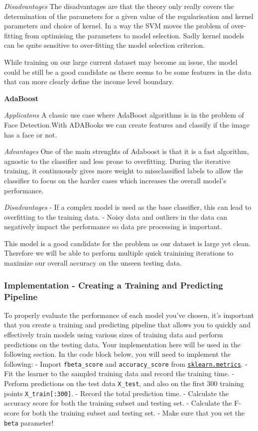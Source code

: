 \documentclass[11pt]{article}
\begin{document}
\emph{Disadvantages} The disadvantages are that the theory only really
covers the determination of the parameters for a given value of the
regularisation and kernel parameters and choice of kernel. In a way the
SVM moves the problem of over-fitting from optimising the parameters to
model selection. Sadly kernel models can be quite sensitive to
over-fitting the model selection criterion.

While training on our large current dataset may become an issue, the
model could be still be a good candidate as there seems to be some
features in the data that can more clearly define the income level
boundary.

\textbf{AdaBoost}

\emph{Applicatons} A classic use case where AdaBoost algorithms is in
the problem of Face Detection.With ADABooks we can create features and
classify if the image has a face or not.

\emph{Advantages} One of the main strenghts of Adaboost is that it is a
fast algorithm, agnostic to the classifier and less prone to
overfitting. During the iterative training, it continuously gives more
weight to missclassified labels to allow the classifier to focus on the
harder cases which increases the overall model's performance.

\emph{Disadvantages} - If a complex model is used as the base
classifier, this can lead to overfitting to the training data. - Noisy
data and outliers in the data can negatively impact the performance so
data pre processing is important.

This model is a good candidate for the problem as our dataset is large
yet clean. Therefore we will be able to perform multiple quick
trainining iterations to maximize our overall accuracy on the unseen
testing data.

    \subsubsection{Implementation - Creating a Training and Predicting
Pipeline}\label{implementation---creating-a-training-and-predicting-pipeline}

To properly evaluate the performance of each model you've chosen, it's
important that you create a training and predicting pipeline that allows
you to quickly and effectively train models using various sizes of
training data and perform predictions on the testing data. Your
implementation here will be used in the following section. In the code
block below, you will need to implement the following: - Import
\texttt{fbeta\_score} and \texttt{accuracy\_score} from
\href{http://scikit-learn.org/stable/modules/classes.html\#sklearn-metrics-metrics}{\texttt{sklearn.metrics}}.
- Fit the learner to the sampled training data and record the training
time. - Perform predictions on the test data \texttt{X\_test}, and also
on the first 300 training points \texttt{X\_train{[}:300{]}}. - Record
the total prediction time. - Calculate the accuracy score for both the
training subset and testing set. - Calculate the F-score for both the
training subset and testing set. - Make sure that you set the
\texttt{beta} parameter!
\end{document}
